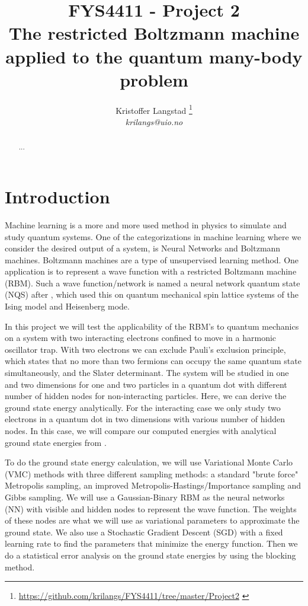 \documentclass[12pt,a4paper,english]{article}
\title{FYS4411 - Project 2\\ The restricted Boltzmann machine applied to the quantum many-body problem}
\date{}
\author{ Kristoffer Langstad \footnote{\url{https://github.com/krilangs/FYS4411/tree/master/Project2} \cite{GitHub}}\\ \textit{krilangs@uio.no}}
\begin{document}
\maketitle
\begin{abstract}
	...
\end{abstract}
\section{Introduction}
\label{sect:Introduction}
Machine learning is a more and more used method in physics to simulate and study quantum systems. One of the categorizations in machine learning where we consider the desired output of a system, is Neural Networks and Boltzmann machines. Boltzmann machines are a type of unsupervised learning method. One application is to represent a wave function with a restricted Boltzmann machine (RBM). Such a wave function/network is named a neural network quantum state (NQS) after \citet{carleo2017solving}, which used this on quantum mechanical spin lattice systems of the Ising model and Heisenberg mode.

In this project we will test the applicability of the RBM's to quantum mechanics on a system with two interacting electrons confined to move in a harmonic oscillator trap. With two electrons we can exclude Pauli's exclusion principle, which states that no more than two fermions can occupy the same quantum state simultaneously, and the Slater determinant. The system will be studied in one and two dimensions for one and two particles in a quantum dot with different number of hidden nodes for non-interacting particles. Here, we can derive the ground state energy analytically. For the interacting case we only study two electrons in a quantum dot in two dimensions with various number of hidden nodes. In this case, we will compare our computed energies with analytical ground state energies from \citet{taut1993two}.

To do the ground state energy calculation, we will use Variational Monte Carlo (VMC) methods with three different sampling methods: a standard "brute force" Metropolis sampling, an improved Metropolis-Hastings/Importance sampling and Gibbs sampling. We will use a Gaussian-Binary RBM as the neural networks (NN) with visible and hidden nodes to represent the wave function. The weights of these nodes are what we will use as variational parameters to approximate the ground state. We also use a Stochastic Gradient Descent (SGD) with a fixed learning rate to find the parameters that minimize the energy function. Then we do a statistical error analysis on the ground state energies by using the blocking method.
\end{document}
